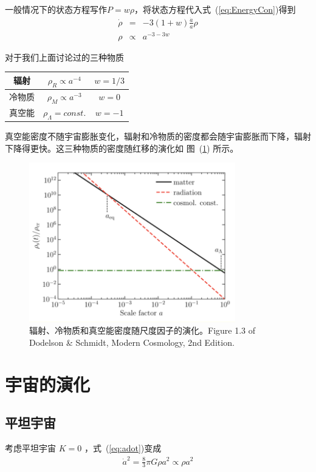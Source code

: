 \documentclass[12pt]{ctexart}
\newcommand{\refeq}[1]{式~(\ref{#1})}
\newcommand{\reffig}[1]{图~(\ref{#1})}
\begin{document}
一般情况下的状态方程写作$P=w\rho$，将状态方程代入\refeq{eq:EnergyCon}得到
\begin{eqnarray}
    \dot{\rho} &=& -3(1+w) \frac{\dot{a}}{a} \rho 
    \\ \rho &\propto& a^{-3-3w}
\end{eqnarray}

对于我们上面讨论过的三种物质
\begin{table}[htb]
    \centering
    \begin{tabular}{|c|c|c|}
    \hline
    辐射  & $\rho_R\propto a^{-4}$ & $w=1/3$ \\ \hline
    冷物质 & $\rho_M\propto a^{-3}$ & $w=0$   \\ \hline
    真空能 & $\rho_\Lambda=const.$  & $w=-1$  \\ \hline
    \end{tabular}
\end{table}

真空能密度不随宇宙膨胀变化，辐射和冷物质的密度都会随宇宙膨胀而下降，辐射下降得更快。这三种物质的密度随红移的演化如 \reffig{fig:matters-a} 所示。

\begin{figure}[!hbtp]
    \centering
    \includegraphics[width=0.8\textwidth]{figures/matters-a.png}
    \caption{辐射、冷物质和真空能密度随尺度因子的演化。Figure 1.3 of Dodelson \& Schmidt, Modern Cosmology, 2nd Edition.}
    \label{fig:matters-a}
\end{figure}

\section{宇宙的演化}

\subsection{平坦宇宙}
考虑平坦宇宙 $K=0$ ，\refeq{eq:adot}变成
\begin{eqnarray}
    \dot{a}^2 = \frac{8}{3} \pi G \rho a^2 \propto \rho a^2
\end{eqnarray} 
\end{document}
